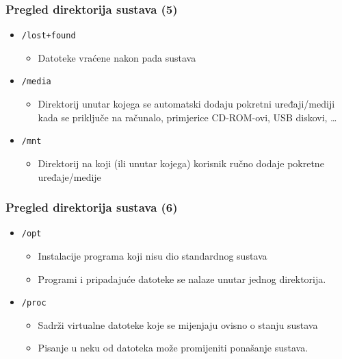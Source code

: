 \documentclass{beamer}
\begin{document}
\begin{frame}[t]
\frametitle{Pregled direktorija sustava (5)}
\begin{itemize}
  \item \texttt{/lost+found}
  \begin{itemize}
    \item Datoteke vraćene nakon pada sustava
  \end{itemize}
  \item \texttt{/media}
  \begin{itemize}
    \item Direktorij unutar kojega se automatski dodaju pokretni
          uređaji/mediji kada se priključe na računalo, primjerice
          CD-ROM-ovi, USB diskovi, \ldots
  \end{itemize}
  \item \texttt{/mnt}
  \begin{itemize}
    \item Direktorij na koji (ili unutar kojega) korisnik ručno dodaje
          pokretne uređaje/medije
  \end{itemize}
\end{itemize}
\end{frame}

\begin{frame}[t]
\frametitle{Pregled direktorija sustava (6)}
\begin{itemize}
  \item \texttt{/opt}
  \begin{itemize}
    \item Instalacije programa koji nisu dio standardnog sustava
    \item Programi i pripadajuće datoteke se nalaze unutar jednog
          direktorija.
  \end{itemize}
  \item \texttt{/proc}
  \begin{itemize}
    \item Sadrži virtualne datoteke koje se mijenjaju ovisno o stanju
          sustava
    \item Pisanje u neku od datoteka može promijeniti ponašanje sustava.
  \end{itemize}
\end{itemize}
\end{frame}
\end{document}
